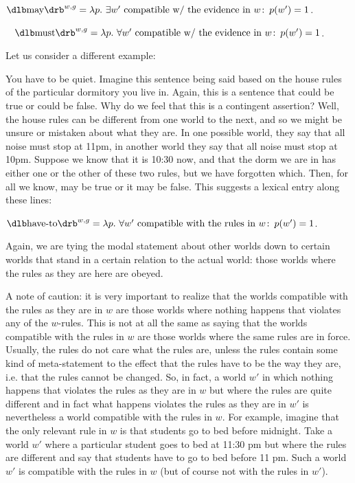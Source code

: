 \ex {}%
$\sv{\mbox{may}}^{w,g} = \lambda p.\ \exists w' \mbox{ compatible w/ the
  evidence in } w\co p(w') = 1$. \xe

\ex~ $\sv{\mbox{must}}^{w,g} = \lambda p.\ \forall w' \mbox{ compatible w/ the
  evidence in } w\co p(w') = 1$. \xe

\kwn
Let us consider a different example:

\ex You have to be quiet. \xe
%
Imagine this sentence being said based on the house rules of the particular
dormitory you live in. Again, this is a sentence that could be true or could be
false. Why do we feel that this is a contingent assertion? Well, the house rules
can be different from one world to the next, and so we might be unsure or
mistaken about what they are. In one possible world, they say that all noise
must stop at 11pm, in another world they say that all noise must stop at 10pm.
Suppose we know that it is 10:30 now, and that the dorm we are in has either one
or the other of these two rules, but we have forgotten which. Then, for all we
know,  may be true or it may be false. This
suggests a lexical entry along these lines:

\ex $\sv{\mbox{have-to}}^{w,g} = \lambda p.\ \forall w' \mbox{ compatible with
  the rules in } w\co p(w') = 1$. \xe

Again, we are tying the modal statement about other worlds down to certain
worlds that stand in a certain relation to the actual world: those worlds where
the rules as they are here are obeyed.

A note of caution: it is very important to realize that the worlds compatible
with the rules as they are in $w$ are those worlds where nothing happens that
violates any of the $w$-rules. This is not at all the same as saying that the
worlds compatible with the rules in $w$ are those worlds where the same rules
are in force. Usually, the rules do not care what the rules are, unless the
rules contain some kind of meta-statement to the effect that the rules have to
be the way they are, i.e. that the rules cannot be changed. So, in fact, a world
$w'$ in which nothing happens that violates the rules as they are in $w$ but
where the rules are quite different and in fact what happens violates the rules
as they are in $w'$ is nevertheless a world compatible with the rules in $w$.
For example, imagine that the only relevant rule in $w$ is that students go to
bed before midnight. Take a world $w'$ where a particular student goes to bed at
11:30 pm but where the rules are different and say that students have to go to
bed before 11 pm. Such a world $w'$ is compatible with the rules in $w$ (but of
course not with the rules in $w'$).

